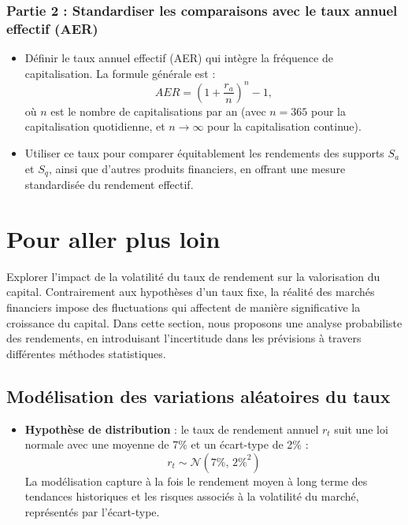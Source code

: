 \documentclass{article}
\begin{document}
\subsubsection*{Partie 2 : Standardiser les comparaisons avec le taux annuel effectif (AER)}
\begin{itemize}
    \item Définir le taux annuel effectif (AER) qui intègre la fréquence de capitalisation. La formule générale est :
    \[
    AER = \left(1 + \frac{r_a}{n}\right)^n - 1,
    \]
    où \( n \) est le nombre de capitalisations par an (avec \( n = 365 \) pour la capitalisation quotidienne, et \( n \to \infty \) pour la capitalisation continue).
    \item Utiliser ce taux pour comparer équitablement les rendements des supports \( S_a \) et \( S_q \), ainsi que d'autres produits financiers, en offrant une mesure standardisée du rendement effectif.
\end{itemize}

\section{Pour aller plus loin}
Explorer l'impact de la volatilité du taux de rendement sur la valorisation du capital. Contrairement aux hypothèses d’un taux fixe, la réalité des marchés financiers impose des fluctuations qui affectent de manière significative la croissance du capital. Dans cette section, nous proposons une analyse probabiliste des rendements, en introduisant l'incertitude dans les prévisions à travers différentes méthodes statistiques.

\subsection{Modélisation des variations aléatoires du taux}
\begin{itemize}
    \item \textbf{Hypothèse de distribution} :  
    le taux de rendement annuel \( r_t \) suit une loi normale avec une moyenne de 7\% et un écart-type de 2\% :  
    \[
    r_t \sim \mathcal{N}(7\%, \, 2\%^2)
    \]
    La modélisation capture à la fois le rendement moyen à long terme des tendances historiques et les risques associés à la volatilité du marché, représentés par l'écart-type.
\end{itemize}
\end{document}
